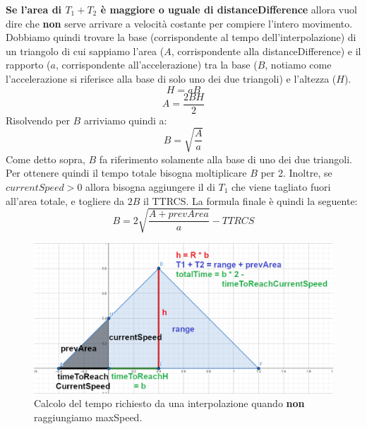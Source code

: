 \documentclass[main.tex]{subfiles}
\begin{document}
\textbf{Se l'area di $T_1 + T_2$ è maggiore o uguale di distanceDifference} allora vuol dire che \textbf{non} serve arrivare a velocità costante per compiere l'intero movimento. Dobbiamo quindi trovare la base (corrispondente al tempo dell'interpolazione) di un triangolo di cui sappiamo l'area ($A$, corrispondente alla distanceDifference) e il rapporto ($a$, corrispondente all'accelerazione) tra la base ($B$, notiamo come l'accelerazione si riferisce alla base di solo uno dei due triangoli) e l'altezza ($H$).
\[H = aB\]
\[A = \frac{2BH}{2}\]
Risolvendo per $B$ arriviamo quindi a:
\[B = \sqrt{\frac{A}{a}}\]
Come detto sopra, $B$ fa riferimento solamente alla base di uno dei due triangoli. Per ottenere quindi il tempo totale bisogna moltiplicare $B$ per 2. Inoltre, se $currentSpeed > 0$ allora bisogna aggiungere il  di $T_1$ che viene tagliato fuori all'area totale, e togliere da $2B$ il TTRCS. La formula finale è quindi la seguente:
\[B = 2\sqrt{\frac{A + prevArea}{a}} - TTRCS\]
\begin{figure}[H]
    \centering
    \includegraphics[width=1\linewidth]{img/interpolazione/speedCapNoMaxSpeedCalcSplice.png}
    \caption{Calcolo del tempo richiesto da una interpolazione quando \textbf{non} raggiungiamo maxSpeed.}
    \label{fig:4_speedCapNoMaxSpeedCalcSplice}
\end{figure}
\end{document}
